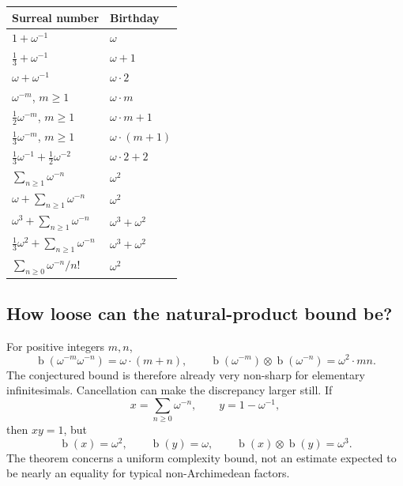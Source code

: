 \documentclass[11pt,letterpaper]{article}
\numberwithin{equation}{section}
\theoremstyle{definition}
\theoremstyle{remark}
\newcommand{\bd}{\operatorname{b}}
\newcommand{\np}{\mathbin{\otimes}}
\begin{document}
\begin{center}
\renewcommand{\arraystretch}{1.32}
\begin{tabular}{@{}p{}l@{}}
\toprule
Surreal number & Birthday\\
\midrule
$1+\omega^{-1}$ & $\omega$\\
$\tfrac13+\omega^{-1}$ & $\omega+1$\\
$\omega+\omega^{-1}$ & $\omega\cdot2$\\
$\omega^{-m}$, $m\geq1$ & $\omega\cdot m$\\
$\tfrac12\omega^{-m}$, $m\geq1$ & $\omega\cdot m+1$\\
$\tfrac13\omega^{-m}$, $m\geq1$ & $\omega\cdot(m+1)$\\
$\tfrac13\omega^{-1}+\tfrac12\omega^{-2}$ & $\omega\cdot2+2$\\
$\sum_{n\geq1}\omega^{-n}$ & $\omega^2$\\
$\omega+\sum_{n\geq1}\omega^{-n}$ & $\omega^2$\\
$\omega^3+\sum_{n\geq1}\omega^{-n}$ & $\omega^3+\omega^2$\\
$\tfrac13\omega^2+\sum_{n\geq1}\omega^{-n}$ & $\omega^3+\omega^2$\\
$\sum_{n\geq0}\omega^{-n}/n!$ & $\omega^2$\\
\bottomrule
\end{tabular}
\end{center}

\subsection{How loose can the natural-product bound be?}
For positive integers $m,n$,
\[
 \bd(\omega^{-m}\omega^{-n})=\omega\cdot(m+n),
 \qquad
 \bd(\omega^{-m})\np\bd(\omega^{-n})=\omega^2\cdot mn.
\]
The conjectured bound is therefore already very non-sharp for elementary
infinitesimals. Cancellation can make the discrepancy larger still. If
\[
 x=\sum_{n\geq0}\omega^{-n},\qquad y=1-\omega^{-1},
\]
then $xy=1$, but
\[
 \bd(x)=\omega^2,\qquad\bd(y)=\omega,
 \qquad\bd(x)\np\bd(y)=\omega^3.
\]
The theorem concerns a uniform complexity bound, not an estimate expected to
be nearly an equality for typical non-Archimedean factors.
\end{document}
